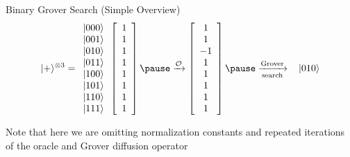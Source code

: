 \documentclass[xcolor=dvipsnames]{beamer}
\begin{document}
\begin{frame}{Binary Grover Search (Simple Overview)}
$$
          \vert + \rangle ^{\otimes 3}=
          \begin{array}{c c c c c c c c c}
          \vert 000 \rangle\\
          \vert 001 \rangle \\
          \vert 010\rangle \\ 
          \vert 011\rangle\\
          \vert 100\rangle\\
          \vert 101 \rangle \\
          \vert 110 \rangle \\
          \vert 111\rangle \end{array}
          \left[
          \begin{array}{c}
          1 \\
          1 \\
          1 \\
          1 \\
          1 \\
          1 \\
          1 \\
          1 \\
          \end{array}
          \right]\pause
          \xrightarrow{\mathcal{O}}
          \left[
          \begin{array}{c}
          1 \\
          1 \\
          -1 \\
          1 \\
          1 \\
          1 \\
          1 \\
          1 \\
          \end{array}
          \right]\pause
          \xrightarrow[\text{search}]{\text{Grover}}\hspace{.3cm}
          \vert 010\rangle                 
$$

\pause Note that here we are omitting  normalization constants and repeated iterations of the oracle and Grover diffusion operator

\end{frame}
\end{document}
